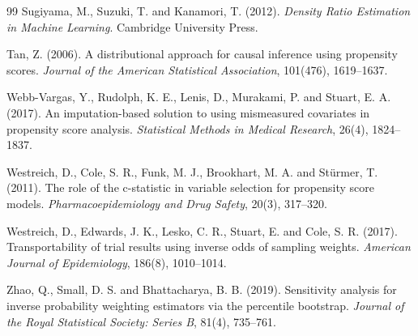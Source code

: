 \documentclass[twoside,11pt]{article}
\theoremstyle{plain}
\theoremstyle{definition}
\begin{document}
\begin{thebibliography}{99}
 Sugiyama, M., Suzuki, T. and Kanamori, T. (2012). \emph{Density Ratio Estimation in Machine Learning}. Cambridge University Press.

 Tan, Z. (2006). A distributional approach for causal inference using propensity scores. \emph{Journal of the American Statistical Association}, 101(476), 1619--1637.

 Webb-Vargas, Y., Rudolph, K. E., Lenis, D., Murakami, P. and Stuart, E. A. (2017). An imputation-based solution to using mismeasured covariates in propensity score analysis. \emph{Statistical Methods in Medical Research}, 26(4), 1824--1837.

 Westreich, D., Cole, S. R., Funk, M. J., Brookhart, M. A. and Stürmer, T. (2011). The role of the c-statistic in variable selection for propensity score models. \emph{Pharmacoepidemiology and Drug Safety}, 20(3), 317--320.

 Westreich, D., Edwards, J. K., Lesko, C. R., Stuart, E. and Cole, S. R. (2017). Transportability of trial results using inverse odds of sampling weights. \emph{American Journal of Epidemiology}, 186(8), 1010--1014.

 Zhao, Q., Small, D. S. and Bhattacharya, B. B. (2019). Sensitivity analysis for inverse probability weighting estimators via the percentile bootstrap. \emph{Journal of the Royal Statistical Society: Series B}, 81(4), 735--761.

\end{thebibliography}
\end{document}
